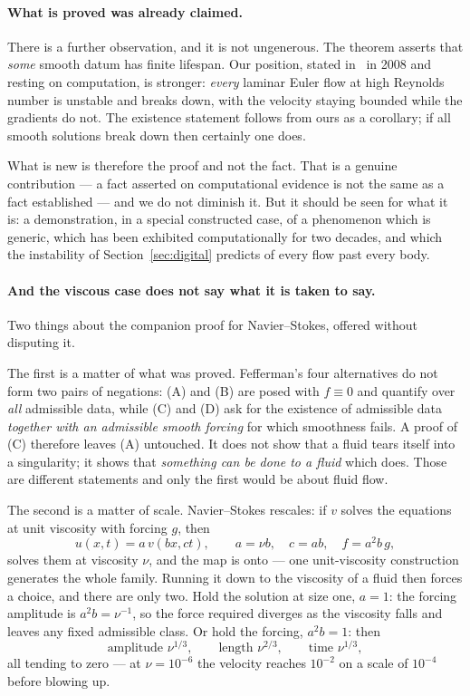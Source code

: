 \documentclass[11pt]{article}
\begin{document}
\paragraph{What is proved was already claimed.} There is a further observation, and it is not
ungenerous. The theorem asserts that \emph{some} smooth datum has finite lifespan. Our position,
stated in~\cite{blowupHJ} in 2008 and resting on computation, is stronger: \emph{every} laminar Euler
flow at high Reynolds number is unstable and breaks down, with the velocity staying bounded while the
gradients do not. The existence statement follows from ours as a corollary; if all smooth solutions
break down then certainly one does.

What is new is therefore the proof and not the fact. That is a genuine contribution --- a fact
asserted on computational evidence is not the same as a fact established --- and we do not diminish
it. But it should be seen for what it is: a demonstration, in a special constructed case, of a
phenomenon which is generic, which has been exhibited computationally for two decades, and which the
instability of Section~\ref{sec:digital} predicts of every flow past every body.

\paragraph{And the viscous case does not say what it is taken to say.} Two things about the
companion proof for Navier--Stokes, offered without disputing it.

The first is a matter of what was proved. Fefferman's four alternatives do not form two pairs of
negations: (A) and (B) are posed with $f\equiv0$ and quantify over \emph{all} admissible data, while
(C) and (D) ask for the existence of admissible data \emph{together with an admissible smooth
forcing} for which smoothness fails. A proof of (C) therefore leaves (A) untouched. It does not show
that a fluid tears itself into a singularity; it shows that \emph{something can be done to a fluid}
which does. Those are different statements and only the first would be about fluid flow.

The second is a matter of scale. Navier--Stokes rescales: if $v$ solves the equations at unit
viscosity with forcing $g$, then
\begin{equation}\label{eq:rescale}
u(x,t)=a\,v(bx,ct),\qquad a=\nu b,\quad c=ab,\quad f=a^2b\,g,
\end{equation}
solves them at viscosity $\nu$, and the map is onto --- one unit-viscosity construction generates the
whole family. Running it down to the viscosity of a fluid then forces a choice, and there are only
two. Hold the solution at size one, $a=1$: the forcing amplitude is $a^2b=\nu^{-1}$, so the force
required diverges as the viscosity falls and leaves any fixed admissible class. Or hold the forcing,
$a^2b=1$: then
\[
\text{amplitude } \nu^{1/3},\qquad \text{length } \nu^{2/3},\qquad \text{time } \nu^{1/3},
\]
all tending to zero --- at $\nu=10^{-6}$ the velocity reaches $10^{-2}$ on a scale of $10^{-4}$
before blowing up.
\end{document}
